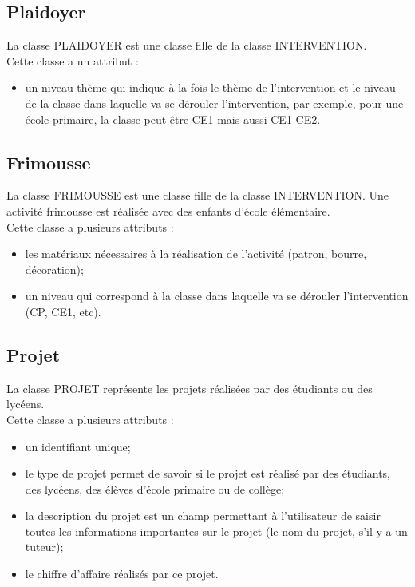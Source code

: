 \documentclass[asi, sansVersion]{picInsa}
\begin{document}
\subsection*{Plaidoyer}
La classe PLAIDOYER est une classe fille de la classe INTERVENTION. \\
Cette classe a un attribut : 
\begin{itemize}
\item un niveau-thème qui indique à la fois le thème de l'intervention et le niveau de la classe dans laquelle va se dérouler l'intervention, par exemple, pour une école primaire, la classe peut être CE1 mais aussi CE1-CE2.
\end{itemize}

\subsection*{Frimousse}
La classe FRIMOUSSE est une classe fille de la classe INTERVENTION. Une activité frimousse est réalisée avec des enfants d'école élémentaire. \\
Cette classe a plusieurs attributs :
\begin{itemize}
\item les matériaux nécessaires à la réalisation de l'activité (patron, bourre, décoration); %
\item un niveau qui correspond à la classe dans laquelle va se dérouler l'intervention (CP, CE1, etc).
\end{itemize}

\subsection*{Projet}
La classe PROJET représente les projets réalisées par des étudiants ou des lycéens.\\
Cette classe a plusieurs attributs : 
\begin{itemize}
\item un identifiant unique;
\item le type de projet permet de savoir si le projet est réalisé par des étudiants, des lycéens, des élèves d'école primaire ou de collège; 
\item la description du projet est un champ permettant à l'utilisateur de saisir toutes les informations importantes sur le projet (le nom du projet, s'il y a un tuteur);
\item le chiffre d'affaire réalisés par ce projet.
\end{itemize}
\end{document}
